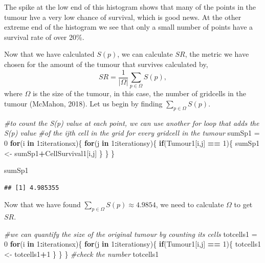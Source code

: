 \documentclass[]{article}
\newenvironment{Shaded}{\begin{snugshade}}{\end{snugshade}}
\newcommand{\DecValTok}[1]{\textcolor[rgb]{0.00,0.00,0.81}{#1}}
\newcommand{\StringTok}[1]{\textcolor[rgb]{0.31,0.60,0.02}{#1}}
\newcommand{\CommentTok}[1]{\textcolor[rgb]{0.56,0.35,0.01}{\textit{#1}}}
\newcommand{\ControlFlowTok}[1]{\textcolor[rgb]{0.13,0.29,0.53}{\textbf{#1}}}
\newcommand{\OperatorTok}[1]{\textcolor[rgb]{0.81,0.36,0.00}{\textbf{#1}}}
\newcommand{\NormalTok}[1]{#1}
\begin{document}
The spike at the low end of this histogram shows that many of the points
in the tumour hve a very low chance of survival, which is good news. At
the other extreme end of the histogram we see that only a small number
of points have a survival rate of over 20\%.

Now that we have calculated \(S(p)\), we can calculate \(SR\), the
metric we have chosen for the amount of the tumour that survives
calculated by, \[SR=\frac{1}{|\Omega|}\sum_{p\in\Omega}S(p),\] where
\(\Omega\) is the size of the tumour, in this case, the number of
gridcells in the tumour (McMahon, 2018). Let us begin by finding
\(\sum_{p\in\Omega}S(p)\).

\begin{Shaded}
\begin{Highlighting}[]
\CommentTok{#to count the S(p) value at each point, we can use another for loop that adds the S(p) value }
\CommentTok{#of the ijth cell in the grid for every gridcell in the tumour}
\NormalTok{sumSp1 =}\StringTok{ }\DecValTok{0}
\ControlFlowTok{for}\NormalTok{(i }\ControlFlowTok{in} \DecValTok{1}\OperatorTok{:}\NormalTok{iterationsx)\{}
  \ControlFlowTok{for}\NormalTok{(j }\ControlFlowTok{in} \DecValTok{1}\OperatorTok{:}\NormalTok{iterationsy)\{}
    \ControlFlowTok{if}\NormalTok{(Tumour1[i,j] }\OperatorTok{==}\StringTok{ }\DecValTok{1}\NormalTok{)\{}
\NormalTok{      sumSp1 <-}\StringTok{ }\NormalTok{sumSp1}\OperatorTok{+}\NormalTok{CellSurvival1[i,j]}
\NormalTok{    \}}
\NormalTok{    \}}
\NormalTok{\}}

\NormalTok{sumSp1}
\end{Highlighting}
\end{Shaded}

\begin{verbatim}
## [1] 4.985355
\end{verbatim}

Now that we have found \(\sum_{p\in\Omega}S(p)\approx 4.9854\), we need
to calculate \(\Omega\) to get \(SR\).

\begin{Shaded}
\begin{Highlighting}[]
\CommentTok{#we can quantify the size of the original tumour by counting its cells}
\NormalTok{totcells1 =}\StringTok{ }\DecValTok{0}
\ControlFlowTok{for}\NormalTok{(i }\ControlFlowTok{in} \DecValTok{1}\OperatorTok{:}\NormalTok{iterationsx)\{}
  \ControlFlowTok{for}\NormalTok{(j }\ControlFlowTok{in} \DecValTok{1}\OperatorTok{:}\NormalTok{iterationsy)\{}
    \ControlFlowTok{if}\NormalTok{(Tumour1[i,j] }\OperatorTok{==}\StringTok{ }\DecValTok{1}\NormalTok{)\{}
\NormalTok{      totcells1 <-}\StringTok{ }\NormalTok{totcells1}\OperatorTok{+}\DecValTok{1}
\NormalTok{    \}}
\NormalTok{  \}}
\NormalTok{\}}
\CommentTok{#check the number}
\NormalTok{totcells1}
\end{Highlighting}
\end{Shaded}
\end{document}
